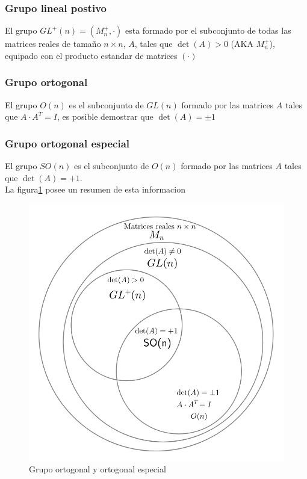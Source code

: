 \subsubsection{Grupo lineal postivo}
El grupo $GL^+(n) = (M_n^+, \cdot)$ esta formado por el subconjunto de todas las
matrices reales de tamaño $n \times n$, $A$, tales que $\det(A) > 0$ (AKA $M_n^+$),
equipado con el producto estandar de matrices $(\cdot)$

\subsubsection{Grupo ortogonal}
El grupo $O(n)$ es el subconjunto de $GL(n)$ formado por las matrices $A$ tales
que $A \cdot A^T = I$, es posible demostrar que $\det(A) = \pm 1$

\subsubsection{Grupo ortogonal especial}
El grupo $SO(n)$ es el subconjunto de $O(n)$ formado por las matrices $A$ tales
que $\det(A) = +1$.\\

La figura\ref{fig:o} posee un resumen de esta informacion
\begin{figure}[!ht]
  \centering
  \includegraphics[scale=0.3]{rsc/set}
  \caption{Grupo ortogonal y ortogonal especial}\label{fig:o}
\end{figure}


